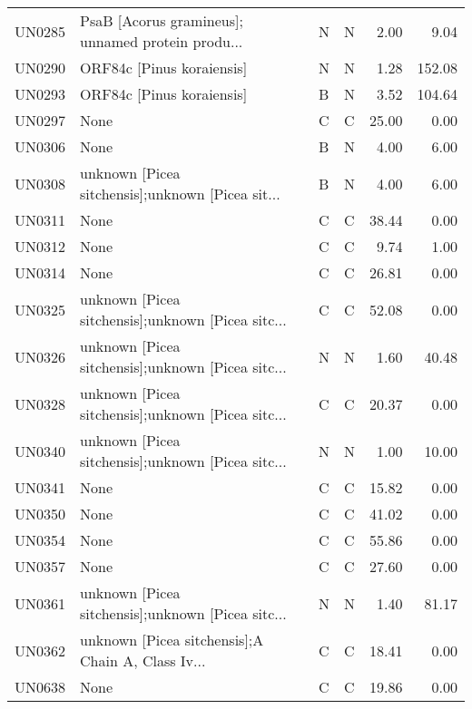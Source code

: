 \begin{longtable}{llllrr}
UN0285 &  PsaB [Acorus gramineus]; unnamed protein produ... &      N &   N &           2.00 &          9.04 \\
UN0290 &                          ORF84c [Pinus koraiensis] &      N &   N &           1.28 &        152.08 \\
UN0293 &                          ORF84c [Pinus koraiensis] &      B &   N &           3.52 &        104.64 \\
UN0297 &                                               None &      C &   C &          25.00 &          0.00 \\
UN0306 &                                               None &      B &   N &           4.00 &          6.00 \\
UN0308 &   unknown [Picea sitchensis];unknown [Picea sit... &      B &   N &           4.00 &          6.00 \\
UN0311 &                                               None &      C &   C &          38.44 &          0.00 \\
UN0312 &                                               None &      C &   C &           9.74 &          1.00 \\
UN0314 &                                               None &      C &   C &          26.81 &          0.00 \\
UN0325 &  unknown [Picea sitchensis];unknown [Picea sitc... &      C &   C &          52.08 &          0.00 \\
UN0326 &  unknown [Picea sitchensis];unknown [Picea sitc... &      N &   N &           1.60 &         40.48 \\
UN0328 &  unknown [Picea sitchensis];unknown [Picea sitc... &      C &   C &          20.37 &          0.00 \\
UN0340 &  unknown [Picea sitchensis];unknown [Picea sitc... &      N &   N &           1.00 &         10.00 \\
UN0341 &                                               None &      C &   C &          15.82 &          0.00 \\
UN0350 &                                               None &      C &   C &          41.02 &          0.00 \\
UN0354 &                                               None &      C &   C &          55.86 &          0.00 \\
UN0357 &                                               None &      C &   C &          27.60 &          0.00 \\
UN0361 &  unknown [Picea sitchensis];unknown [Picea sitc... &      N &   N &           1.40 &         81.17 \\
UN0362 &  unknown [Picea sitchensis];A Chain A, Class Iv... &      C &   C &          18.41 &          0.00 \\
UN0638 &                                               None &      C &   C &          19.86 &          0.00 \\
\end{longtable}
